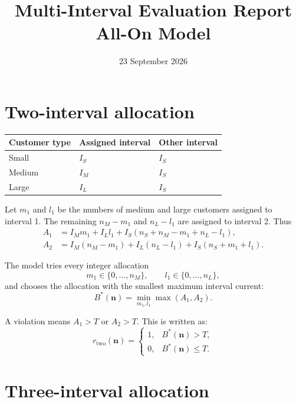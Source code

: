 \documentclass[11pt,a4paper]{article}
\title{Multi-Interval Evaluation Report\\\large All-On Model}
\author{}
\date{23 September 2026}
\begin{document}
\maketitle


\section{Two-interval allocation}


\begin{center}
\begin{tabular}{lll}
\toprule
Customer type & Assigned interval & Other interval\\
\midrule
Small & \(I_S\) & \(I_S\)\\
Medium & \(I_M\) & \(I_S\)\\
Large & \(I_L\) & \(I_S\)\\
\bottomrule
\end{tabular}
\end{center}

Let \(m_1\) and \(l_1\) be the numbers of medium and large customers assigned
to interval 1. The remaining \(n_M-m_1\) and \(n_L-l_1\) are assigned to
interval 2. Thus
\begin{align}
    A_1&=I_Mm_1+I_Ll_1+I_S(n_S+n_M-m_1+n_L-l_1),\\
    A_2&=I_M(n_M-m_1)+I_L(n_L-l_1)+I_S(n_S+m_1+l_1).
\end{align}

The model tries every integer allocation
\begin{equation}
    m_1\in\{0,\ldots,n_M\},\qquad l_1\in\{0,\ldots,n_L\},
\end{equation}
and chooses the allocation with the smallest maximum interval current:
\begin{equation}
    B^*(\boldsymbol n)=\min_{m_1,l_1}\max(A_1,A_2).
\end{equation}


A violation means \(A_1>T\) or \(A_2>T\). This is written as: 
\begin{equation}
    r_{\mathrm{two}}(\boldsymbol n)=
    \begin{cases}
        1,&B^*(\boldsymbol n)>T,\\
        0,&B^*(\boldsymbol n)\leq T.
    \end{cases}
\end{equation}



\section{Three-interval allocation}
\end{document}

